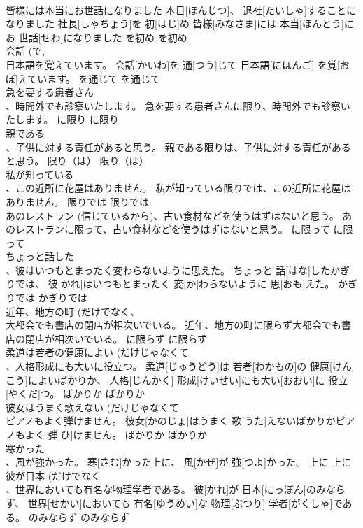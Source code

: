 \documentclass[8pt]{extreport}
\begin{document}
\begin{CJK}{UTF8}{min}
\\	皆様には本当にお世話になりました	本日[ほんじつ]、 退社[たいしゃ]することになりました 社長[しゃちょう]を 初[はじ]め 皆様[みなさま]には 本当[ほんとう]にお 世話[せわ]になりました	を初め	を初め	
\\	会話 (で, 
\\	日本語を覚えています。	会話[かいわ]を 通[つう]じて 日本語[にほんご] を覚[おぼ]えています。	を通じて	を通じて	
\\	急を要する患者さん 
\\	、時間外でも診察いたします。	急を要する患者さんに限り、時間外でも診察いたします。	に限り	に限り	
\\	親である
\\	、子供に対する責任があると思う。	親である限りは、子供に対する責任があると思う。	限り（は）	限り（は）	
\\	私が知っている 
\\	、この近所に花屋はありません。	私が知っている限りでは、この近所に花屋はありません。	限りでは	限りでは	
\\	あのレストラン (信じているから)、古い食材などを使うはずはないと思う。	あのレストランに限って、古い食材などを使うはずはないと思う。	に限って	に限って	
\\	ちょっと話した 
\\	、彼はいつもとまったく変わらないように思えた。	ちょっと 話[はな]したかぎりでは、 彼[かれ]はいつもとまったく 変[か]わらないように 思[おも]えた。	かぎりでは	かぎりでは	
\\	近年、地方の町 (だけでなく、
\\	大都会でも書店の閉店が相次いでいる。	近年、地方の町に限らず大都会でも書店の閉店が相次いでいる。	に限らず	に限らず	
\\	柔道は若者の健康によい (だけじゃなくて 
\\	、人格形成にも大いに役立つ。	柔道[じゅうどう]は 若者[わかもの]の 健康[けんこう]によいばかりか、 人格[じんかく] 形成[けいせい]にも大い[おおい]に 役立[やくだ]つ。	ばかりか	ばかりか	
\\	彼女はうまく歌えない (だけじゃなくて 
\\	ピアノもよく弾けません。	彼女[かのじょ]はうまく 歌[うた]えないばかりかピアノもよく 弾[ひ]けません。	ばかりか	ばかりか	
\\	寒かった 
\\	、風が強かった。	寒[さむ]かった上に、 風[かぜ]が 強[つよ]かった。	上に	上に	
\\	彼が日本 (だけでなく 
\\	、世界においても有名な物理学者である。	彼[かれ]が 日本[にっぽん]のみならず、 世界[せかい]においても 有名[ゆうめい]な 物理[ぶつり] 学者[がくしゃ]である。	のみならず	のみならず	

\end{CJK}
\end{document}

